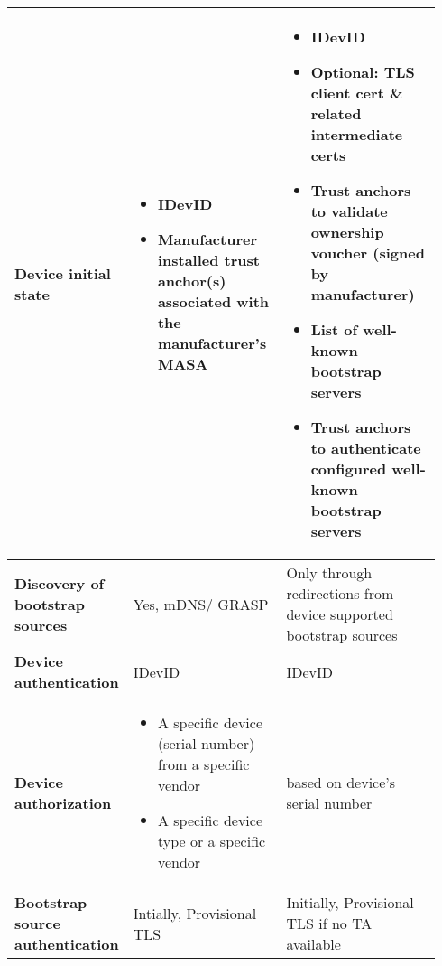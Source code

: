 \begin{longtable}{|m{0.171\linewidth}|m{0.372\linewidth}|m{0.393\linewidth}|}
		\hline
		\rowcolor[rgb]{ .745,  .804,  .843} \textbf{Device initial state} & \multicolumn{1}{p{18.335em}|}{\cellcolor[rgb]{ 1,  1,  1}
			\begin{itemize}[leftmargin=*, topsep=0pt, noitemsep]
			\item
			IDevID
			\item
			Manufacturer installed trust anchor(s) associated with the manufacturer's MASA
			\end{itemize}
		} & \multicolumn{1}{p{18.335em}|}{\cellcolor[rgb]{ 1,  1,  1}
			\begin{itemize}[leftmargin=*, topsep=0pt, noitemsep]
			\item
			 IDevID
			\item
			 Optional:
			 TLS client cert \& related intermediate certs 
			\item
			 Trust anchors to validate ownership voucher (signed by manufacturer)
			\item
			 List of well-known bootstrap servers 
			\item
			 Trust anchors to authenticate configured well-known bootstrap servers
			\end{itemize}
		 } \bigstrut\\

		\hline
		\rowcolor[rgb]{ .745,  .804,  .843} \textbf{Discovery of bootstrap sources} & \cellcolor[rgb]{ 1,  1,  1}Yes, mDNS/ GRASP & \multicolumn{1}{p{18.335em}|}{\cellcolor[rgb]{ 1,  1,  1}Only through redirections from device supported bootstrap sources} \bigstrut\\

		\hline
		\rowcolor[rgb]{ .745,  .804,  .843} \textbf{Device authentication} & \cellcolor[rgb]{ 1,  1,  1}IDevID & \cellcolor[rgb]{ 1,  1,  1}IDevID \bigstrut\\

		\hline
		\rowcolor[rgb]{ .745,  .804,  .843} \textbf{Device authorization} & \multicolumn{1}{p{18.335em}|}{\cellcolor[rgb]{ 1,  1,  1} 
			\begin{itemize}[leftmargin=*, topsep=0pt, noitemsep]
			\item
				A specific device (serial number) from a specific vendor
			\item
				A specific device type or a specific vendor
			\end{itemize}
		}
		& \cellcolor[rgb]{ 1,  1,  1}based on device's serial number \bigstrut\\

		\hline
		\rowcolor[rgb]{ .745,  .804,  .843} \textbf{Bootstrap source authentication} & \cellcolor[rgb]{ 1,  1,  1}Intially, Provisional TLS & \cellcolor[rgb]{ 1,  1,  1}Initially, Provisional TLS if no TA available \bigstrut\\


\end{longtable}
